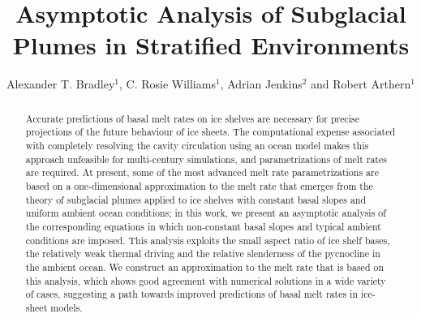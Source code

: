 \documentclass[openacc]{rsproca_new}%
\begin{document}
\title{Asymptotic Analysis of Subglacial Plumes in Stratified Environments}

\author{%
Alexander T. Bradley$^{1}$, C. Rosie Williams$^{1}$, Adrian Jenkins$^{2}$ and Robert Arthern$^{1}$}

\address{$^{1}$British Antarctic Survey, Cambridge, UK\\
$^{2}$Department of Geography and Environmental Sciences, Northumbria University, Newcastle upon Tyne, UK.}

\subject{Oceanography, Glaciology, Mathematical Modelling}



\begin{abstract}
Accurate predictions of basal melt rates on ice shelves are necessary for precise projections of the future behaviour of ice sheets. The computational expense associated with completely resolving the cavity circulation using an ocean model makes this approach unfeasible for multi-century simulations, and parametrizations of melt rates are required. At present, some of the most advanced melt rate parametrizations are based on a one-dimensional approximation to the melt rate that emerges from the theory of subglacial plumes applied to ice shelves with constant basal slopes and uniform ambient ocean conditions; in this work, we present an asymptotic analysis of the corresponding equations in which non-constant basal slopes and typical ambient conditions are imposed. This analysis exploits the small aspect ratio of ice shelf bases, the relatively weak thermal driving and the relative slenderness of the pycnocline in the ambient ocean. We construct an approximation to the melt rate that is based on this analysis, which shows good agreement with numerical solutions in a wide variety of cases, suggesting a path towards improved predictions of basal melt rates in ice-sheet models.
\end{abstract}

\end{document}
